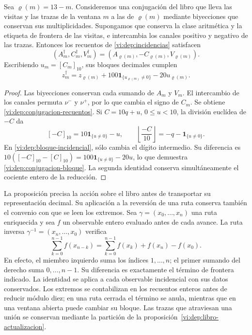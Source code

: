 \begin{proposition}
\label{vi:dep:conjugacion-incidencial}
Sea \(\varrho(m)=13-m\). Consideremos una conjugación del libro
que lleva las visitas y las trazas de la ventana \(m\) a las de
\(\varrho(m)\) mediante biyecciones que conservan sus multiplicidades.
Supongamos que conserva la clase aritmética y la etiqueta de frontera
de las visitas, e intercambia los canales positivo y negativo de las
trazas. Entonces los recuentos de \eqref{vi:dep:incidencias} satisfacen
\begin{equation}
 (A_m^\dagger,C_m^\dagger,V_m^\dagger)
 =(A_{\varrho(m)},-C_{\varrho(m)},V_{\varrho(m)}).
 \label{vi:dep:conjugacion-recuentos}
\end{equation}
Escribiendo \(u_m=[C_m]_{10}\), sus bloques decimales cumplen
\begin{equation}
 z_m^\dagger=z_{\varrho(m)}
       +100\mathbf1_{\{u_{\varrho(m)}\ne0\}}-20u_{\varrho(m)}.
 \label{vi:dep:conjugacion-bloque}
\end{equation}
\end{proposition}
\begin{proof}
Las biyecciones conservan cada sumando de \(A_m\) y \(V_m\).
El intercambio de los canales permuta \(\nu^-\) y \(\nu^+\),
por lo que cambia el signo de \(C_m\). Se obtiene
\eqref{vi:dep:conjugacion-recuentos}. Si \(C=10q+u\),
\(0\le u<10\), la división euclídea de \(-C\) da
\[
 [-C]_{10}=10\mathbf1_{\{u\ne0\}}-u,
 \qquad
 \left\lfloor\frac{-C}{10}\right\rfloor
 =-q-\mathbf1_{\{u\ne0\}}.
\]
En \eqref{vi:dep:bloque-incidencial}, sólo cambia el dígito
intermedio. Su diferencia es
\(10([-C]_{10}-[C]_{10})=100\mathbf1_{\{u\ne0\}}-20u\),
lo que demuestra \eqref{vi:dep:conjugacion-bloque}. La segunda
identidad conserva simultáneamente el cociente entero de la reducción.
\end{proof}

La proposición precisa la acción sobre el libro antes de transportar
su representación decimal. Su aplicación a la reversión de una ruta
conserva también el convenio con que se leen los extremos. Sea
\(\gamma=(x_0,\ldots,x_n)\) una ruta enriquecida y sea \(f\) un
observable entero evaluado antes de cada avance. La ruta inversa
\(\gamma^{-1}=(x_n,\ldots,x_0)\) verifica
\begin{equation}
 \sum_{k=0}^{n-1}f(x_{n-k})
 =\sum_{k=0}^{n-1}f(x_k)+f(x_n)-f(x_0).
 \label{vi:dep:conjugacion-frontera}
\end{equation}
En efecto, el miembro izquierdo suma los índices \(1,\ldots,n\);
el primer sumando del derecho suma \(0,\ldots,n-1\). Su diferencia
es exactamente el término de frontera indicado. La identidad se aplica
a cada observable incidencial con sus datos conservados. Los extremos
se contabilizan en los recuentos enteros antes de reducir módulo diez;
en una ruta cerrada el término se anula, mientras que en una ventana
abierta puede cambiar su bloque. Las trazas que atraviesan una unión
se conservan mediante la partición de la
proposición~\ref{vi:dep:libro-actualizacion}.

